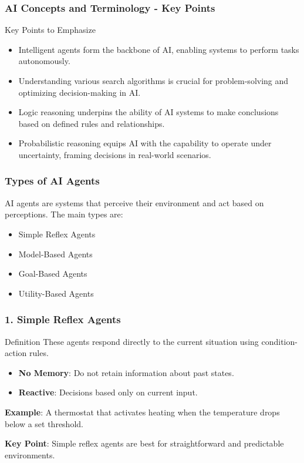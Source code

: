 \documentclass[aspectratio=169]{beamer}
\begin{document}
\begin{frame}[fragile]
    \frametitle{AI Concepts and Terminology - Key Points}
    \begin{block}{Key Points to Emphasize}
        \begin{itemize}
            \item Intelligent agents form the backbone of AI, enabling systems to perform tasks autonomously.
            \item Understanding various search algorithms is crucial for problem-solving and optimizing decision-making in AI.
            \item Logic reasoning underpins the ability of AI systems to make conclusions based on defined rules and relationships.
            \item Probabilistic reasoning equips AI with the capability to operate under uncertainty, framing decisions in real-world scenarios.
        \end{itemize}
    \end{block}
\end{frame}

\begin{frame}[fragile]
    \frametitle{Types of AI Agents}
    AI agents are systems that perceive their environment and act based on perceptions. The main types are:
    \begin{itemize}
        \item Simple Reflex Agents
        \item Model-Based Agents
        \item Goal-Based Agents
        \item Utility-Based Agents
    \end{itemize}
\end{frame}

\begin{frame}[fragile]
    \frametitle{1. Simple Reflex Agents}
    \begin{block}{Definition}
        These agents respond directly to the current situation using condition-action rules.
    \end{block}
    \begin{itemize}
        \item \textbf{No Memory}: Do not retain information about past states.
        \item \textbf{Reactive}: Decisions based only on current input.
    \end{itemize}
    \textbf{Example}: A thermostat that activates heating when the temperature drops below a set threshold.
    
    \textbf{Key Point}: Simple reflex agents are best for straightforward and predictable environments.
\end{frame}
\end{document}
